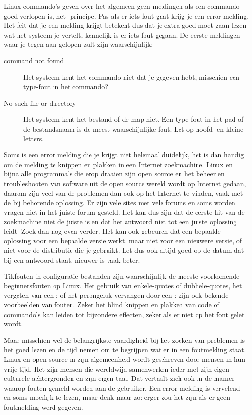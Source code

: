 Linux commando's geven over het algemeen geen meldingen als een commando goed verlopen is, het -principe. Pas als er iets fout gaat krijg je een error-melding. Het feit dat je een melding krijgt betekent dus dat je extra goed moet gaan lezen wat het systeem je vertelt, kennelijk is er iets fout gegaan. De eerste meldingen waar je tegen aan gelopen zult zijn waarschijnlijk:
\begin{description}
\item[command not found] Het systeem kent het commando niet dat je gegeven hebt, misschien een type-fout in het commando?
\item[No such file or directory] Het systeem kent het bestand of de map niet. Een type fout in het pad of de bestandsnaam is de meest waarschijnlijke fout. Let op hoofd- en kleine letters.
\end{description}

Soms is een error melding die je krijgt niet helemaal duidelijk, het is dan handig om de melding te knippen en plakken in een Internet zoekmachine. Linux en bijna alle programma's die erop draaien zijn open source en het beheer en troubleshooten van software uit de open source wereld wordt op Internet gedaan, daarom zijn veel van de problemen dan ook op het Internet te vinden, vaak met de bij behorende oplossing. Er zijn vele sites met vele forums en soms worden vragen niet in het juiste forum gesteld. Het kan dus zijn dat de eerste hit van de zoekmachine niet de juiste is en dat het antwoord niet tot een juiste oplossing leidt. Zoek dan nog even verder. Het kan ook gebeuren dat een bepaalde oplossing voor een bepaalde versie werkt, maar niet voor een nieuwere versie, of niet voor de distributie die je gebruikt. Let dus ook altijd goed op de datum dat bij een antwoord staat, nieuwer is vaak beter.

Tikfouten in configuratie bestanden zijn waarschijnlijk de meeste voorkomende beginnersfouten op Linux. Het gebruik van enkele-quotes of dubbele-quotes, het vergeten van een ; of het perongeluk vervangen door een : zijn ook bekende voorbeelden van fouten. Zeker het blind knippen en plakken van code of commando's kan leiden tot bijzondere effecten, zeker als er niet op het font gelet wordt.

Maar misschien wel de belangrijkste vaardigheid bij het zoeken van problemen is het goed lezen en de tijd nemen om te begrijpen wat er in een foutmelding staat. Linux en open source in zijn algemeenheid wordt geschreven door mensen in hun vrije tijd. Het zijn mensen die wereldwijd samenwerken ieder met zijn eigen culturele achtergronden en zijn eigen taal. Dat vertaalt zich ook in de manier waarop fouten gemeld worden aan de gebruiker. Een error-melding is vervelend en soms moeilijk te lezen, maar denk maar zo: erger zou het zijn als er geen foutmelding werd gegeven.

